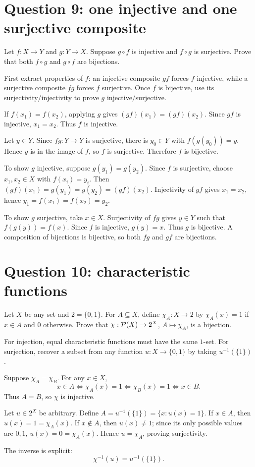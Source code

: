 \documentclass[11pt,openany]{book}
\begin{document}
\section{Question 9: one injective and one surjective composite}
\begin{questionbox}
Let $f:X\to Y$ and $g:Y\to X$. Suppose $g\circ f$ is injective and $f\circ g$ is surjective. Prove that both $f\circ g$ and $g\circ f$ are bijections.
\end{questionbox}
\begin{approachbox}
First extract properties of $f$: an injective composite $g f$ forces $f$ injective, while a surjective composite $f g$ forces $f$ surjective. Once $f$ is bijective, use its surjectivity/injectivity to prove $g$ injective/surjective.
\end{approachbox}
\begin{solutionbox}
If $f(x_1)=f(x_2)$, applying $g$ gives $(gf)(x_1)=(gf)(x_2)$. Since $gf$ is injective, $x_1=x_2$. Thus $f$ is injective.

Let $y\in Y$. Since $fg:Y\to Y$ is surjective, there is $y_0\in Y$ with $f(g(y_0))=y$. Hence $y$ is in the image of $f$, so $f$ is surjective. Therefore $f$ is bijective.

To show $g$ injective, suppose $g(y_1)=g(y_2)$. Since $f$ is surjective, choose $x_1,x_2\in X$ with $f(x_i)=y_i$. Then
$(gf)(x_1)=g(y_1)=g(y_2)=(gf)(x_2)$. Injectivity of $gf$ gives $x_1=x_2$, hence $y_1=f(x_1)=f(x_2)=y_2$.

To show $g$ surjective, take $x\in X$. Surjectivity of $fg$ gives $y\in Y$ such that $f(g(y))=f(x)$. Since $f$ is injective, $g(y)=x$. Thus $g$ is bijective. A composition of bijections is bijective, so both $fg$ and $gf$ are bijections.
\end{solutionbox}

\section{Question 10: characteristic functions}
\begin{questionbox}
Let $X$ be any set and $2=\{0,1\}$. For $A\subseteq X$, define $\chi_A:X\to2$ by $\chi_A(x)=1$ if $x\in A$ and $0$ otherwise. Prove that $\chi:\mathcal P(X)\to2^X$, $A\mapsto\chi_A$, is a bijection.
\end{questionbox}
\begin{approachbox}
For injection, equal characteristic functions must have the same $1$-set. For surjection, recover a subset from any function $u:X\to\{0,1\}$ by taking $u^{-1}(\{1\})$.
\end{approachbox}
\begin{solutionbox}
Suppose $\chi_A=\chi_B$. For any $x\in X$,
\[
x\in A\iff\chi_A(x)=1\iff\chi_B(x)=1\iff x\in B.
\]
Thus $A=B$, so $\chi$ is injective.

Let $u\in2^X$ be arbitrary. Define $A=u^{-1}(\{1\})=\{x:u(x)=1\}$. If $x\in A$, then $u(x)=1=\chi_A(x)$. If $x\notin A$, then $u(x)\ne1$; since its only possible values are $0,1$, $u(x)=0=\chi_A(x)$. Hence $u=\chi_A$, proving surjectivity.

The inverse is explicit:
\[
\chi^{-1}(u)=u^{-1}(\{1\}).
\]
\end{solutionbox}
\end{document}
